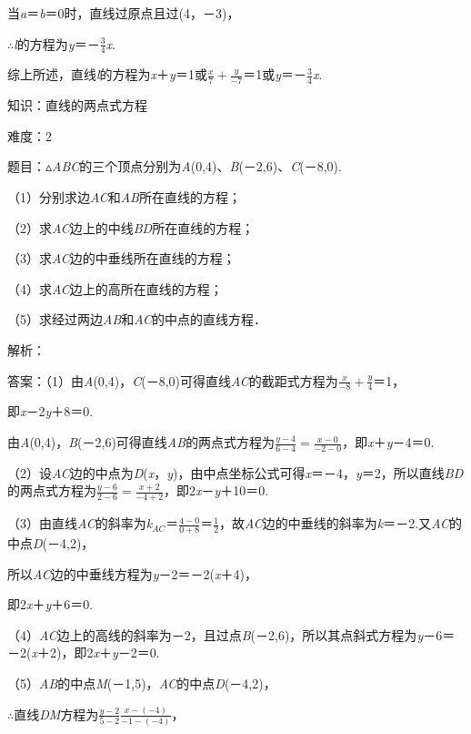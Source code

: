 \documentclass{article} %
\begin{document}
当\textit{a}＝\textit{b}＝0时，直线过原点且过(4，－3)，

$\mathrm{\therefore}$\textit{l}的方程为\textit{y}＝－$\frac{3}{4}$\textit{x}.

综上所述，直线\textit{l}的方程为\textit{x}＋\textit{y}＝1或$\frac{x}{7}+\frac{y}{-7}$＝1或\textit{y}＝－$\frac{3}{4}$\textit{x}.

知识：直线的两点式方程

难度：2

题目：$\mathrm{\vartriangle}$\textit{ABC}的三个顶点分别为\textit{A}(0,4)、\textit{B}(－2,6)、\textit{C}(－8,0).

（1）分别求边\textit{AC}和\textit{AB}所在直线的方程；

（2）求\textit{AC}边上的中线\textit{BD}所在直线的方程；

（3）求\textit{AC}边的中垂线所在直线的方程；

（4）求\textit{AC}边上的高所在直线的方程；

（5）求经过两边\textit{AB}和\textit{AC}的中点的直线方程．

解析：

答案：（1）由\textit{A}(0,4)，\textit{C}(－8,0)可得直线\textit{AC}的截距式方程为$\frac{x}{-8}+\frac{y}{4}$＝1，

即\textit{x}－2\textit{y}＋8＝0.

由\textit{A}(0,4)，\textit{B}(－2,6)可得直线\textit{AB}的两点式方程为$\frac{y-4}{6-4}=\frac{x-0}{-2-0}$，即\textit{x}＋\textit{y}－4＝0.

（2）设\textit{AC}边的中点为\textit{D}(\textit{x}，\textit{y})，由中点坐标公式可得\textit{x}＝－4，\textit{y}＝2，所以直线\textit{BD}的两点式方程为$\frac{y-6}{2-6}=\frac{x+2}{-4+2}$，即2\textit{x}－\textit{y}＋10＝0.

（3）由直线\textit{AC}的斜率为\textit{k${}_{AC}$}＝$\frac{4-0}{0+8}$＝$\frac{1}{2}$，故\textit{AC}边的中垂线的斜率为\textit{k}＝－2.又\textit{AC}的中点\textit{D}(－4,2)，

所以\textit{AC}边的中垂线方程为\textit{y}－2＝－2(\textit{x}＋4)，

即2\textit{x}＋\textit{y}＋6＝0.

（4）\textit{AC}边上的高线的斜率为－2，且过点\textit{B}(－2,6)，所以其点斜式方程为\textit{y}－6＝－2(\textit{x}＋2)，即2\textit{x}＋\textit{y}－2＝0.

（5）\textit{AB}的中点\textit{M}(－1,5)，\textit{AC}的中点\textit{D}(－4,2)，

$\mathrm{\therefore}$直线\textit{DM}方程为$\frac{y-2}{5-2}\frac{x-(-4)}{-1-(-4)}$，
\end{document}
